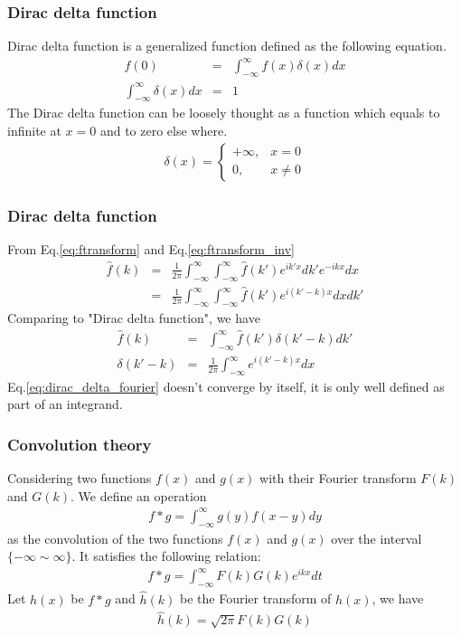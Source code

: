 \documentclass{beamer}
\begin{document}
\begin{frame}
\frametitle{Dirac delta function}
Dirac delta function is a generalized function defined as the following equation.
\begin{eqnarray}
f(0) &=&\int_{-\infty}^{\infty} f(x)\delta{(x)} dx \nonumber \\
\int_{-\infty}^{\infty}\delta{(x)} dx &=& 1
\label{eq:dirac_delta}
\end{eqnarray}
The Dirac delta function can be loosely thought as a function which equals to infinite at $x = 0$ and to zero else where.
\begin{eqnarray}
\delta(x) = \begin{cases} +\infty, & x = 0 \\ 0, & x \ne 0 \end{cases} \nonumber
\end{eqnarray}
\end{frame}
\begin{frame}
\frametitle{Dirac delta function}
From Eq.\ref{eq:ftransform} and Eq.\ref{eq:ftransform_inv}
\begin{eqnarray}
\hat{f}(k)&=&\frac{1}{2\pi}\int_{-\infty}^{\infty} \int_{-\infty}^{\infty} \hat{f}(k') e^{ik'x} dk' e^{-ikx} dx \nonumber \\
          &=&\frac{1}{2\pi}\int_{-\infty}^{\infty} \int_{-\infty}^{\infty} \hat{f}(k') e^{i(k'-k)x} dx dk' \nonumber
\end{eqnarray}
Comparing to "Dirac delta function", we have
\begin{eqnarray}
\hat{f}(k)&=&\int_{-\infty}^{\infty} \hat{f}(k') \delta{(k'- k)} dk' \nonumber \\
\delta{(k'- k)} &=& \frac{1}{2\pi}\int_{-\infty}^{\infty} e^{i(k'-k)x} dx
\label{eq:dirac_delta_fourier}
\end{eqnarray}
Eq.\ref{eq:dirac_delta_fourier} doesn't converge by itself, it is only well defined as part of an integrand.
\end{frame}
\begin{frame}
\frametitle{Convolution theory}
Considering two functions $f(x)$ and $g(x)$ with their Fourier transform $F(k)$ and $G(k)$. We define an operation
\begin{eqnarray}
f\ast g = \int_{-\infty}^{\infty}g(y)f(x-y)dy
\label{eq:convolution}
\end{eqnarray}
as the convolution of the two functions $f(x)$ and $g(x)$ over the interval $\{ -\infty \sim \infty \}$. It satisfies the following relation:
\begin{eqnarray}
f \ast g = \int_{-\infty}^{\infty}F(k)G(k) e^{ikx}dt
\label{eq:convolution_theorem}
\end{eqnarray}
Let $h(x)$ be $f \ast g$ and $\hat{h}(k)$ be the Fourier transform of $h(x)$, we have
\begin{eqnarray}
\hat{h}(k) = \sqrt{2\pi}F(k)G(k)
\label{eq:convolution_theorem2}
\end{eqnarray}
\end{frame}
\end{document}
